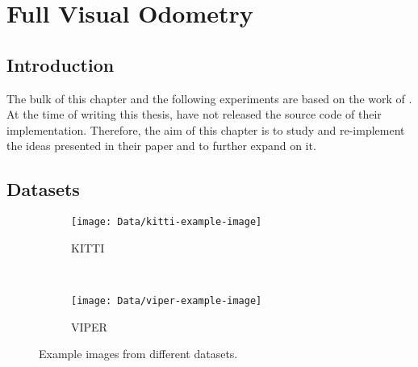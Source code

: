\chapter{Full Visual Odometry}

	\section{Introduction}
	The bulk of this chapter and the following experiments are based on the work of \cite{wang2017deepvo}.
	At the time of writing this thesis, \citeauthor{wang2017deepvo} have not released the source code of their implementation.
	Therefore, the aim of this chapter is to study and re-implement the ideas presented in their paper and to further expand on it.
	
	\section{Datasets}
		\begin{figure}
			\centering
			\begin{subfigure}[b]{0.8\linewidth}
				\centering
				\texttt{[image: Data/kitti-example-image]}
				\caption{
					KITTI
					\label{fig:kitti-example-image}
				}
			\end{subfigure}%
			\\
			\begin{subfigure}[b]{0.8\linewidth}
				\centering
				\texttt{[image: Data/viper-example-image]}
				\caption{
					VIPER
					\label{fig:viper-example-image}
				}
			\end{subfigure}%
			\caption[Example images from different datasets]
					{Example images from different datasets.
					 \label{fig:example-images-from-datasets}}
		\end{figure}
